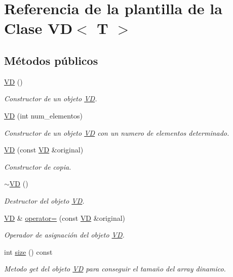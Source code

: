 \hypertarget{classVD}{}\section{Referencia de la plantilla de la Clase VD$<$ T $>$}
\label{classVD}
\subsection*{Métodos públicos}
\begin{DoxyCompactItemize}
\item 
\hyperlink{classVD_a85d6e04a09adabaefe28fc440f4d9102}{VD} ()
\begin{DoxyCompactList}\small\item\em Constructor de un objeto \hyperlink{classVD}{VD}. \end{DoxyCompactList}\item 
\hyperlink{classVD_ae0b07f71bdbb515e4cb3cb397a8b2f8c}{VD} (int num\+\_\+elementos)
\begin{DoxyCompactList}\small\item\em Constructor de un objeto \hyperlink{classVD}{VD} con un numero de elementos determinado. \end{DoxyCompactList}\item 
\hyperlink{classVD_ad1b6a98793128fe8fa7adca6e5fddb0f}{VD} (const \hyperlink{classVD}{VD} \&original)
\begin{DoxyCompactList}\small\item\em Constructor de copia. \end{DoxyCompactList}\item 
\hyperlink{classVD_a0533f99aa2fee31fde63edd6c4b8bb2d}{$\sim$\+VD} ()
\begin{DoxyCompactList}\small\item\em Destructor del objeto \hyperlink{classVD}{VD}. \end{DoxyCompactList}\item 
\hyperlink{classVD}{VD} \& \hyperlink{classVD_ad97cd77c2bad24bba0884bacc050f7e5}{operator=} (const \hyperlink{classVD}{VD} \&original)
\begin{DoxyCompactList}\small\item\em Operador de asignación del objeto \hyperlink{classVD}{VD}. \end{DoxyCompactList}\item 
int \hyperlink{classVD_a411ad026db1c8e0617d9031f1f1017a5}{size} () const
\begin{DoxyCompactList}\small\item\em Metodo get del objeto \hyperlink{classVD}{VD} para conseguir el tamaño del array dinamico. \end{DoxyCompactList}\item 

\end{DoxyCompactItemize}
